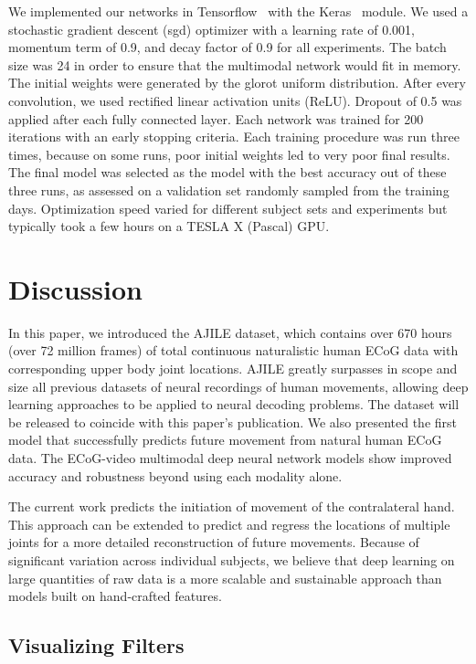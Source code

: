 \documentclass[letterpaper]{article} %
\begin{document}
We implemented our networks in Tensorflow~\cite{tensorflow2015-whitepaper} with the Keras~\cite{chollet2015keras} module. 
We used a stochastic gradient descent (sgd) optimizer with a learning rate of 0.001, momentum term of 0.9, and decay factor of 0.9 for all experiments. 
The batch size was 24 in order to ensure that the multimodal network would fit in memory. 
The initial weights were generated by the glorot uniform distribution. 
After every convolution, we used rectified linear activation units (ReLU). 
Dropout of 0.5 was applied after each fully connected layer. 
Each network was trained for 200 iterations with an early stopping criteria. 
Each training procedure was run three times, because on some runs, poor initial weights led to very poor final results.
The final model was selected as the model with the best accuracy out of these three runs, as assessed on a validation set randomly sampled from the training days.
Optimization speed varied for different subject sets and experiments but typically took a few hours on a TESLA X (Pascal) GPU.


\section{Discussion}

In this paper, we introduced the AJILE dataset, which contains over 670 hours (over 72 million frames) of total continuous naturalistic human ECoG data with corresponding upper body joint locations. 
AJILE greatly surpasses in scope and size all previous datasets of neural recordings of human movements, allowing deep learning approaches to be applied to neural decoding problems. 
The dataset will be released to coincide with this paper's publication. 
We also presented the first model that successfully predicts future movement from natural human ECoG data. 
The ECoG-video multimodal deep neural network models show improved accuracy and robustness beyond using each modality alone. 


The current work predicts the initiation of movement of the contralateral hand. This approach can be extended to predict and regress the locations of multiple joints for a more detailed reconstruction of future movements. 
Because of significant variation across individual subjects, we believe that deep learning on large quantities of raw data is a more scalable and sustainable approach than models built on hand-crafted features.


\subsection{Visualizing Filters}
\end{document}
